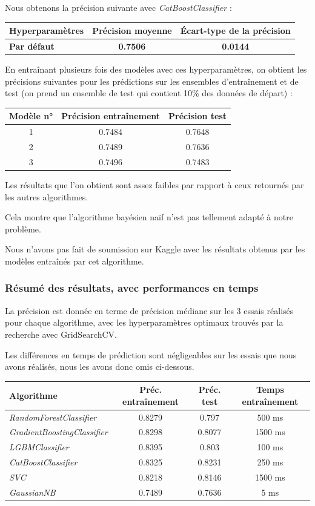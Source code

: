\documentclass[a4paper]{article}
\begin{document}
    Nous obtenons la précision suivante avec {\it CatBoostClassifier} :

    \begin{tabular}{| l | *{2}{c|}}
        \hline
        Hyperparamètres & Précision moyenne & Écart-type de la précision
        \tabularnewline
        \hline
        \textbf{Par défaut} & \textbf{0.7506} & \textbf{0.0144}
        \tabularnewline
        \hline
    \end{tabular}

    En entraînant plusieurs fois des modèles avec ces hyperparamètres, on obtient les précisions suivantes pour les prédictions 
    sur les ensembles d'entraînement et de test (on prend un ensemble de test qui contient 10\% des données de départ) :

    \begin{tabular}{| *{3}{c|}}
        \hline
        Modèle n° & Précision entraînement & Précision test
        \tabularnewline
        \hline
        1 & 0.7484 & 0.7648
        \tabularnewline
        \hline
        2 & 0.7489 & 0.7636
        \tabularnewline
        \hline
        3 & 0.7496 & 0.7483
        \tabularnewline
        \hline
    \end{tabular}

    Les résultats que l'on obtient sont assez faibles par rapport à ceux retournés par les autres algorithmes.

    Cela montre que l'algorithme bayésien naïf n'est pas tellement adapté à notre problème.

    Nous n'avons pas fait de soumission sur Kaggle avec les résultats obtenus par les modèles
    entraînés par cet algorithme.

    \subsubsection{Résumé des résultats, avec performances en temps}

    La précision est donnée en terme de précision médiane sur les 3 essais réalisés pour chaque algorithme,
    avec les hyperparamètres optimaux trouvés par la recherche avec GridSearchCV.

    Les différences en temps de prédiction sont négligeables sur les essais que nous avons réalisés,
    nous les avons donc omis ci-dessous.

    \begin{tabular}{| l | *{3}{c|}}
        \hline
        Algorithme & Préc. entraînement & Préc. test & Temps entraînement
        \tabularnewline
        \hline
        {\it RandomForestClassifier} & 0.8279 & 0.797 & 500 ms
        \tabularnewline
        \hline
        {\it GradientBoostingClassifier} & 0.8298 & 0.8077 & 1500 ms
        \tabularnewline
        \hline
        {\it LGBMClassifier} & 0.8395 & 0.803 & 100 ms
        \tabularnewline
        \hline
        {\it CatBoostClassifier} & 0.8325 & 0.8231 & 250 ms
        \tabularnewline
        \hline
        {\it SVC} & 0.8218 & 0.8146 & 1500 ms
        \tabularnewline
        \hline
        {\it GaussianNB} & 0.7489 & 0.7636 & 5 ms
        \tabularnewline
        \hline
    \end{tabular}
\end{document}
